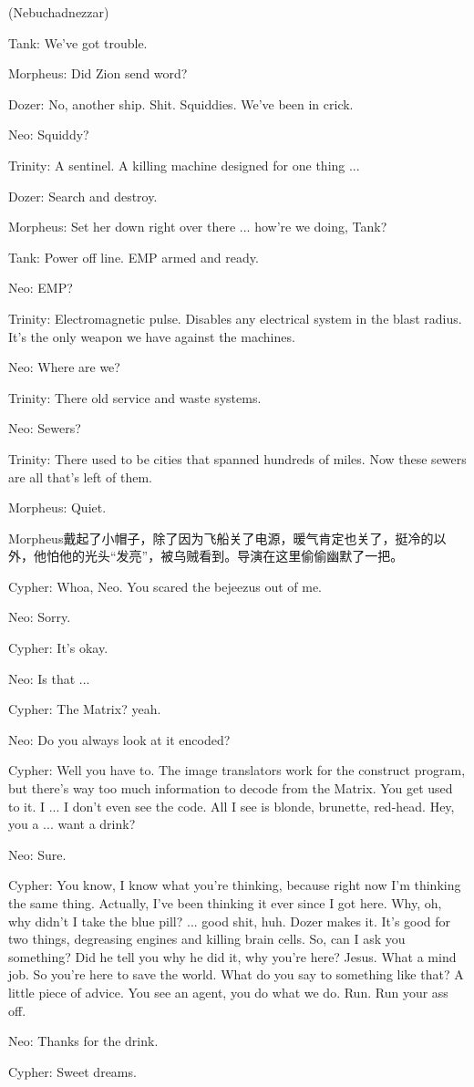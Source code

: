 \documentclass{ctexart}
\newenvironment{myquote}{\color{green} \setlength{\leftskip}{6em} \setlength{\rightskip}{4em} \setlength{\parindent}{-2em}}{\par}
\begin{document}
\begin{myquote}
(Nebuchadnezzar)

Tank: We've got trouble.

Morpheus: Did Zion send word?

Dozer: No, another ship. Shit. Squiddies. We've been in crick.

Neo: Squiddy?

Trinity: A sentinel. A killing machine designed for one thing ...

Dozer: Search and destroy.

Morpheus: Set her down right over there ... how're we doing, Tank?

Tank: Power off line. EMP armed and ready.

Neo: EMP?

Trinity: Electromagnetic pulse. Disables any electrical system in the blast radius. It's the only weapon we have against the machines.

Neo: Where are we?

Trinity: There old service and waste systems.

Neo: Sewers?

Trinity: There used to be cities that spanned hundreds of miles. Now these sewers are all that's left of them.

Morpheus: Quiet.
\end{myquote}

Morpheus戴起了小帽子，除了因为飞船关了电源，暖气肯定也关了，挺冷的以外，他怕他的光头“发亮”，被乌贼看到。导演在这里偷偷幽默了一把。

\begin{myquote}
Cypher: Whoa, Neo. You scared the bejeezus out of me.

Neo: Sorry.

Cypher: It's okay.

Neo: Is that ...

Cypher: The Matrix? yeah.

Neo: Do you always look at it encoded?

Cypher: Well you have to. The image translators work for the construct program, but there's way too much information to decode from the Matrix. You get used to it. I ... I don't even see the code. All I see is blonde, brunette, red-head. Hey, you a ... want a drink?

Neo: Sure.

Cypher: You know, I know what you're thinking, because right now I'm thinking the same thing. Actually, I've been thinking it ever since I got here. Why, oh, why didn't I take the blue pill? ... good shit, huh. Dozer makes it. It's good for two things, degreasing engines and killing brain cells. So, can I ask you something? Did he tell you why he did it, why you're here? Jesus. What a mind job. So you're here to save the world. What do you say to something like that? A little piece of advice. You see an agent, you do what we do. Run. Run your ass off.

Neo: Thanks for the drink.

Cypher: Sweet dreams.
\end{myquote}
\end{document}
